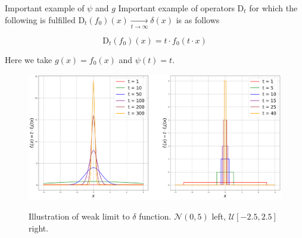 \documentclass[aspectratio=169]{beamer}
\begin{document}
    \begin{frame}{Important example of $\psi$ and $g$}
        \small
        Important example of operators $\text{D}_t$ for which the following is fulfilled $\text{D}_t(f_0)(x) \underset{t \to \infty}{\longrightarrow} \delta(x)$ is as follows 

        \begin{equation*}
            \text{D}_t(f_0)(x) = t \cdot f_0(t \cdot x)
        \end{equation*}

        Here we take $g(x) = f_0(x)$ and $\psi(t) = t$. 

        \begin{figure}[h!]
            \centering
            \includegraphics[width=0.55\linewidth]{pictures/example1.png}
            
            Illustration of weak limit to $\delta$ function. $\mathcal{N}(0, 5)$ left, $\mathcal{U}[-2.5, 2.5]$ right.
            \label{example1_fig}
        \end{figure}
        
    \end{frame}
\end{document}
